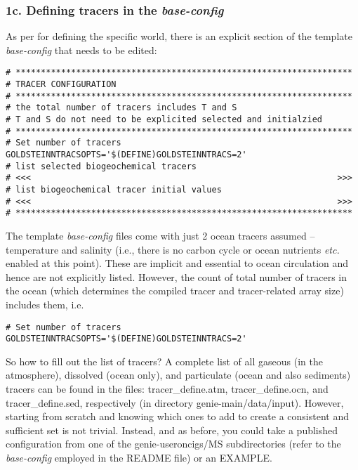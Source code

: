 \documentclass[11pt,fleqn]{book} %
\begin{document}
%
\subsubsection{1c. Defining tracers in the \textit{base-config}}

As per for defining the specific world, there is an explicit section of the template \textit{base-config} that needs to be edited: 

\footnotesize\vspace{-2pt}\begin{verbatim}
# *******************************************************************
# TRACER CONFIGURATION
# *******************************************************************
# the total number of tracers includes T and S
# T and S do not need to be explicited selected and initialzied
# *******************************************************************
# Set number of tracers
GOLDSTEINNTRACSOPTS='$(DEFINE)GOLDSTEINNTRACS=2'
# list selected biogeochemical tracers
# <<<                                                             >>>
# list biogeochemical tracer initial values
# <<<                                                             >>>
# *******************************************************************
\end{verbatim}\vspace{-2pt}\normalsize

The template \textit{base-config} files come with just 2 ocean tracers assumed -- temperature and salinity (i.e., there is no carbon cycle or ocean nutrients \textit{etc.} enabled at this point). These are implicit and essential to ocean circulation and hence are not explicitly listed. However, the count of total number of tracers in the ocean (which determines the compiled tracer and tracer-related array size) includes them, i.e.

\footnotesize\vspace{-2pt}\begin{verbatim}
# Set number of tracers
GOLDSTEINNTRACSOPTS='$(DEFINE)GOLDSTEINNTRACS=2'
\end{verbatim}\vspace{-2pt}\normalsize

So how to fill out the list of tracers? A complete list of all gaseous (in the atmosphere), dissolved (ocean only), and particulate (ocean and also sediments) tracers can be found in the files: \textsf{\footnotesize tracer\_define.atm}, \textsf{\footnotesize tracer\_define.ocn}, and \textsf{\footnotesize tracer\_define.sed}, respectively (in directory \textsf{\footnotesize genie-main/data/input}). However, starting from scratch and knowing which ones to add to create a consistent and sufficient set is not trivial. Instead, and as before, you could take a published configuration from one of the \textsf{\footnotesize genie-useroncigs/MS} subdirectories (refer to the \textit{base-config} employed in the README file) or an EXAMPLE.
\end{document}
